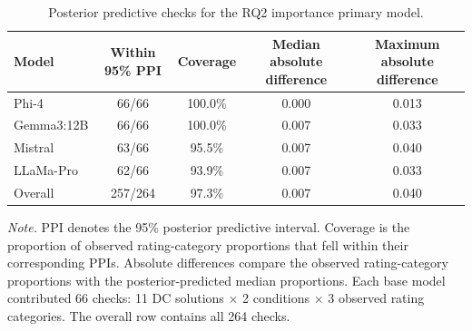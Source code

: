 \begin{table}[tbp]
\caption{Posterior predictive checks for the RQ2 importance primary model.}
\label{tab:rq2_importance_primary_ppc}
\begin{tabular}{lcccc}
\toprule
Model & Within 95\% PPI & Coverage & Median absolute difference & Maximum absolute difference \\
\midrule
Phi-4 & 66/66 & 100.0\% & 0.000 & 0.013 \\
Gemma3:12B & 66/66 & 100.0\% & 0.007 & 0.033 \\
Mistral & 63/66 & 95.5\% & 0.007 & 0.040 \\
LLaMa-Pro & 62/66 & 93.9\% & 0.007 & 0.033 \\
Overall & 257/264 & 97.3\% & 0.007 & 0.040 \\
\bottomrule
\end{tabular}
\vspace{2pt}
\begin{minipage}{\linewidth}
\footnotesize\textit{Note.} PPI denotes the 95\% posterior predictive interval. Coverage is the proportion of observed rating-category proportions that fell within their corresponding PPIs. Absolute differences compare the observed rating-category proportions with the posterior-predicted median proportions. Each base model contributed 66 checks: 11 DC solutions $\times$ 2 conditions $\times$ 3 observed rating categories. The overall row contains all 264 checks.
\end{minipage}
\end{table}
